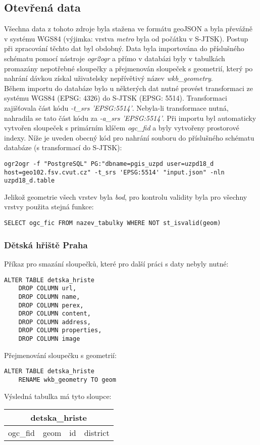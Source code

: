 \documentclass[a4paper, 12pt]{article}
\begin{document}
\subsection{Otevřená data}
Všechna data z tohoto zdroje byla stažena ve formátu geoJSON a byla převážně v systému WGS84 (výjimka: vrstva \textit{metro} byla od počátku v S-JTSK). Postup při zpracování těchto dat byl obdobný. Data byla importována do příslušného schématu pomocí nástroje \textit{ogr2ogr} a přímo v databázi byly v tabulkách promazány nepotřebné sloupečky a přejmenován sloupeček s geometrií, který po nahrání dávkou získal uživatelsky nepřívětivý název \textit{wkb\_ge\-o\-metry}.\\

Během importu do databáze bylo u některých dat nutné provést transformaci ze systému WGS84 (EPSG: 4326) do S-JTSK (EPSG: 5514). Transformaci zajišťovala část kódu \linebreak \textsl{-t\_srs 'EPSG:5514'}. Nebyla-li transformace nutná, nahradila se tato část kódu za \textsl{-a\_srs 'EPSG:5514'}. Při importu byl automaticky vytvořen sloupeček s primárním klíčem \textsl{ogc\_fid} a byly vytvořeny prostorové indexy. Níže je uveden obecný kód pro nahrání souboru do příslušného schématu databáze (s transformací do S-JTSK):

\begin{lstlisting}
ogr2ogr -f "PostgreSQL" PG:"dbname=pgis_uzpd user=uzpd18_d host=geo102.fsv.cvut.cz" -t_srs 'EPSG:5514' "input.json" -nln uzpd18_d.table
\end{lstlisting}
Jelikož geometrie všech vrstev byla \textit{bod}, pro kontrolu validity byla pro všechny vrstvy použita stejná funkce:
\begin{lstlisting}
SELECT ogc_fic FROM nazev_tabulky WHERE NOT st_isvalid(geom)
\end{lstlisting}

\subsubsection*{Dětská hřiště Praha}
Příkaz pro smazání sloupečků, které pro další práci s daty nebyly nutné:
\begin{lstlisting}
ALTER TABLE detska_hriste
    DROP COLUMN url,
    DROP COLUMN name,
    DROP COLUMN perex,
    DROP COLUMN content,
    DROP COLUMN address,
    DROP COLUMN properties,
    DROP COLUMN image
\end{lstlisting}
Přejmenování sloupečku s geometrií:
\begin{lstlisting}
ALTER TABLE detska_hriste
    RENAME wkb_geometry TO geom
\end{lstlisting} 
Výsledná tabulka má tyto sloupce:
\begin{table}[h!]
\centering
\begin{tabular}{|c|c|c|c|}
\hline
\multicolumn{4}{|c|}{\textbf{detska\_hriste}} \\ \hline
ogc\_fid     & geom     & id     & district    \\ \hline
\end{tabular}
\end{table}
\end{document}
